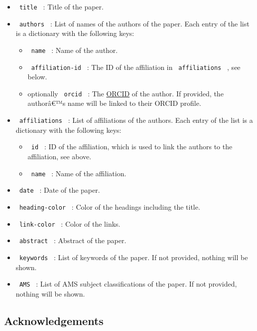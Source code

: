 \begin{itemize}
\tightlist
\item
  \texttt{\ title\ } : Title of the paper.
\item
  \texttt{\ authors\ } : List of names of the authors of the paper. Each
  entry of the list is a dictionary with the following keys:

  \begin{itemize}
  \tightlist
  \item
    \texttt{\ name\ } : Name of the author.
  \item
    \texttt{\ affiliation-id\ } : The ID of the affiliation in
    \texttt{\ affiliations\ } , see below.
  \item
    optionally \texttt{\ orcid\ } : The \href{https://orcid.org/}{ORCID}
    of the author. If provided, the authorâ€™s name will be linked to
    their ORCID profile.
  \end{itemize}
\item
  \texttt{\ affiliations\ } : List of affiliations of the authors. Each
  entry of the list is a dictionary with the following keys:

  \begin{itemize}
  \tightlist
  \item
    \texttt{\ id\ } : ID of the affiliation, which is used to link the
    authors to the affiliation, see above.
  \item
    \texttt{\ name\ } : Name of the affiliation.
  \end{itemize}
\item
  \texttt{\ date\ } : Date of the paper.
\item
  \texttt{\ heading-color\ } : Color of the headings including the
  title.
\item
  \texttt{\ link-color\ } : Color of the links.
\item
  \texttt{\ abstract\ } : Abstract of the paper.
\item
  \texttt{\ keywords\ } : List of keywords of the paper. If not
  provided, nothing will be shown.
\item
  \texttt{\ AMS\ } : List of AMS subject classifications of the paper.
  If not provided, nothing will be shown.
\end{itemize}

\subsection{Acknowledgements}\label{acknowledgements}

